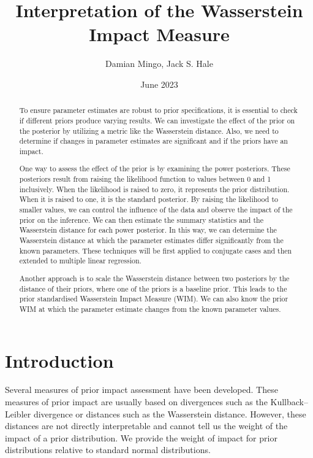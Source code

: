 \documentclass[12pt]{article}
\title{Interpretation of the Wasserstein Impact Measure}
\author{Damian Mingo, Jack S. Hale}
\date{June 2023}
\begin{document}
\maketitle


\begin{abstract}

To ensure parameter estimates are robust to prior specifications, it is essential to check if different priors produce varying results. We can investigate the effect of the prior on the posterior by utilizing a metric like the Wasserstein distance. Also, we need to determine if changes in parameter estimates are significant and if the priors have an impact.

One way to assess the effect of the prior is by examining the power posteriors. These posteriors result from raising the likelihood function to values between 0 and 1 inclusively. When the likelihood is raised to zero, it represents the prior distribution. When it is raised to one, it is the standard posterior. By raising the likelihood to smaller values, we can control the influence of the data and observe the impact of the prior on the inference. We can then estimate the summary statistics and the Wasserstein distance for each power posterior. In this way, we can determine the Wasserstein distance at which the parameter estimates differ significantly from the known parameters. These techniques will be first applied to conjugate cases and then extended to multiple linear regression.

Another approach is to scale the Wasserstein distance between two posteriors by the distance of their priors, where one of the priors is a baseline prior. This leads to the prior standardised Wasserstein Impact Measure (WIM). We can also know the prior WIM at which the parameter estimate changes from the known parameter values. 
\end{abstract}

\section{Introduction}

Several measures of prior impact assessment have been developed. These measures of prior impact are usually based on divergences such as the Kullback–Leibler divergence or distances such as the Wasserstein distance. However, these distances are not directly interpretable and cannot tell us the weight of the impact of a prior distribution. We provide the weight of impact for prior distributions relative to standard normal distributions.
\end{document}
